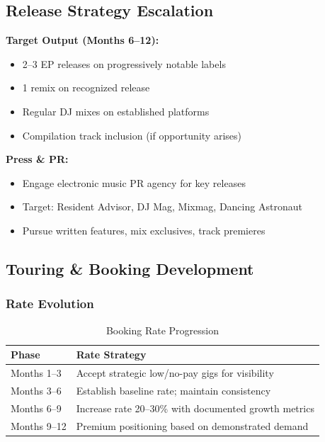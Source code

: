 \documentclass[11pt,a4paper]{article}
\begin{document}
\subsection{Release Strategy Escalation}

\noindent\textbf{Target Output (Months 6--12):}
\begin{itemize}[leftmargin=*]
    \item 2--3 EP releases on progressively notable labels
    \item 1 remix on recognized release
    \item Regular DJ mixes on established platforms
    \item Compilation track inclusion (if opportunity arises)
\end{itemize}

\noindent\textbf{Press \& PR:}
\begin{itemize}[leftmargin=*]
    \item Engage electronic music PR agency for key releases
    \item Target: Resident Advisor, DJ Mag, Mixmag, Dancing Astronaut
    \item Pursue written features, mix exclusives, track premieres
\end{itemize}

\subsection{Touring \& Booking Development}

\subsubsection{Rate Evolution}

\begin{table}[h!]
\centering
\renewcommand{\arraystretch}{1.3}
\begin{tabularx}{\textwidth}{l X}
\toprule
\rowcolor{amaraprimary}
\textcolor{amaracream}{\textbf{Phase}} & \textcolor{amaracream}{\textbf{Rate Strategy}} \\
\midrule
Months 1--3 & Accept strategic low/no-pay gigs for visibility \\
Months 3--6 & Establish baseline rate; maintain consistency \\
Months 6--9 & Increase rate 20--30\% with documented growth metrics \\
Months 9--12 & Premium positioning based on demonstrated demand \\
\bottomrule
\end{tabularx}
\caption{Booking Rate Progression}
\end{table}
\end{document}

